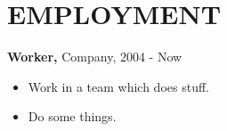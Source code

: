 \section{EMPLOYMENT} 
	{{\bf Worker,} Company}, 2004 - Now
    \begin{itemize}
	\item Work in a team which does stuff.
	\item Do some things.
    \end{itemize}